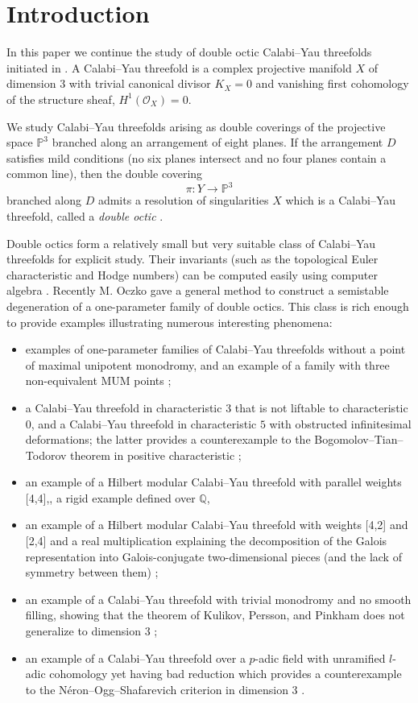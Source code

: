 \documentclass[12pt]{amsart}
\theoremstyle{plain}
\theoremstyle{remark}
\theoremstyle{definition}
\newcommand{\PP}{\mathbb P}
\newcommand\QQ{{\mathbb Q}}
\numberwithin{table}{section}
\begin{document}
\section*{Introduction}

In this paper we continue the study of double octic Calabi--Yau threefolds
initiated in \cite{CK-C}. A Calabi--Yau threefold is a complex projective
manifold $X$ of dimension $3$ with trivial canonical divisor $K_X = 0$
and vanishing first cohomology of the structure sheaf,
$H^1(\mathcal O_X)=0$.

We study Calabi--Yau threefolds arising as double coverings of the
projective space $\PP^3$ branched along an arrangement of eight planes.
If the arrangement $D$ satisfies mild conditions
(no six planes intersect and no four planes contain a common line),
then the double covering
\[
\pi \colon Y \to \PP^3
\]
branched along $D$ admits a resolution of singularities $X$ which is a
Calabi--Yau threefold, called a \emph{double octic} \cite{CSz}.

Double octics form a relatively small but very suitable class of
Calabi--Yau threefolds for explicit study.
Their invariants (such as the topological Euler characteristic and
Hodge numbers) can be computed easily using computer algebra
\cite{CvS}.
Recently M. Oczko gave a general method to construct a semistable degeneration of a one-parameter family of double octics.
This class is rich enough to provide examples illustrating numerous
interesting phenomena:
\begin{itemize}
	\item examples of one-parameter families of Calabi--Yau threefolds
	without a point of maximal unipotent monodromy, and an example of a
	family with three non-equivalent MUM points \cite{CvS};
	\item a Calabi--Yau threefold in characteristic $3$ that is not
	liftable to characteristic $0$, and a Calabi--Yau threefold in
	characteristic $5$ with obstructed infinitesimal deformations; the
	latter provides a counterexample to the Bogomolov--Tian--Todorov
	theorem in positive characteristic \cite{CvS3};
	\item an example of a Hilbert modular Calabi--Yau threefold with parallel weights [4,4],, a rigid example defined over $\QQ$\cite{CScvS},
	\item  an example of a Hilbert modular Calabi--Yau threefold with weights [4,2] and [2,4] and a real multiplication explaining the decomposition of the Galois representation into Galois-conjugate two-dimensional pieces (and the lack of symmetry between them) \cite{CScvS};
	\item an example of a Calabi--Yau threefold with trivial monodromy and
	no smooth filling, showing that the theorem of Kulikov, Persson, and
	Pinkham does not generalize to dimension $3$ \cite{CvS5};
	\item an example of a Calabi--Yau threefold over a $p$-adic field with unramified $l$-adic cohomology yet having bad reduction which provides a counterexample to the N\'eron--Ogg--Shafarevich criterion in dimension 3 \cite{CO}.
\end{itemize}
\end{document}
